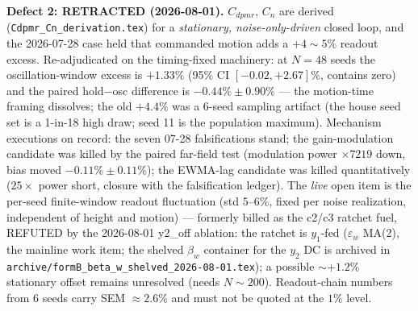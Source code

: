 \documentclass[11pt,a4paper,fontset=none]{ctexart}
\begin{document}
\textbf{Defect 2: RETRACTED (2026-08-01).}  $C_{dpmr}$, $C_n$ are derived
(\texttt{Cdpmr\_Cn\_derivation.tex}) for a \emph{stationary,
noise-only-driven} closed loop, and the 2026-07-28 case held that
commanded motion adds a $+4\sim5\%$ readout excess.  Re-adjudicated on
the timing-fixed machinery: at $N{=}48$ seeds the oscillation-window
excess is $+1.33\%$ (95\% CI $[-0.02, +2.67]\%$, contains zero) and the
paired hold$-$osc difference is $-0.44\% \pm 0.90\%$ --- the motion-time
framing dissolves; the old $+4.4\%$ was a 6-seed sampling artifact (the
house seed set is a 1-in-18 high draw; seed 11 is the population
maximum).  Mechanism executions on record: the seven 07-28
falsifications stand; the gain-modulation candidate was killed by the
paired far-field test (modulation power $\times 7219$ down, bias moved
$-0.11\% \pm 0.11\%$); the EWMA-lag candidate was killed quantitatively
($25\times$ power short, closure with the falsification ledger).  The
\emph{live} open item is the per-seed finite-window readout fluctuation
(std $5$--$6\%$, fixed per noise realization, independent of height and
motion) --- formerly billed as the c2/c3 ratchet fuel, REFUTED by the
2026-08-01 y2\_off ablation: the ratchet is $y_1$-fed ($\varepsilon_w$
MA(2), the mainline work item; the shelved $\beta_w$ container for the
$y_2$ DC is archived in
\texttt{archive/formB\_beta\_w\_shelved\_2026-08-01.tex}); a
possible $\sim{+}1.2\%$ stationary
offset remains unresolved (needs $N\sim200$).  Readout-chain numbers
from 6 seeds carry SEM $\approx 2.6\%$ and must not be quoted at the
$1\%$ level.
\end{document}
